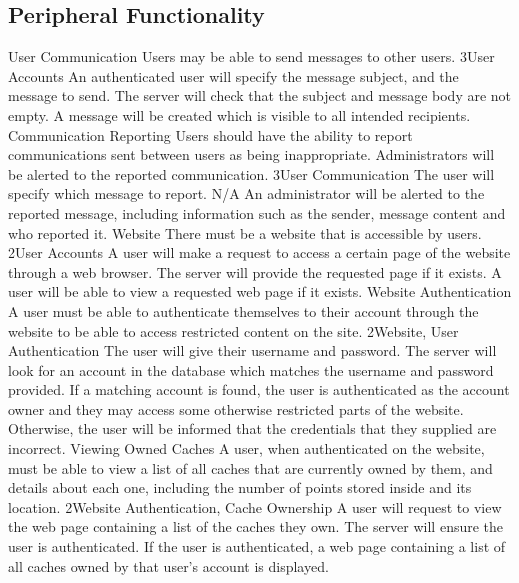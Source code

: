 	\subsection{Peripheral Functionality} %
		\funcreq %
			{User Communication}
			{Users may be able to send messages to other users.}
			{3}{User Accounts}
			{An authenticated user will specify the message subject, and the
			message to send.}
			{The server will check that the subject and message body are not
			empty.}
			{A message will be created which is visible to all intended
			recipients.}
		\funcreq %
			{Communication Reporting}
			{Users should have the ability to report communications sent
			between users as being inappropriate. Administrators will be
			alerted to the reported communication.}
			{3}{User Communication}
			{The user will specify which message to report.}
			{N/A}
			{An administrator will be alerted to the reported message,
			including information such as the sender, message content and who
			reported it.}
		\funcreq %
			{Website}
			{There must be a website that is accessible by users.}
			{2}{User Accounts}
			{A user will make a request to access a certain page of the website
			through a web browser.}
			{The server will provide the requested page if it exists.}
			{A user will be able to view a requested web page if it exists.}
		\funcreq %
			{Website Authentication}
			{A user must be able to authenticate themselves to their account
			through the website to be able to access restricted content on the
			site.}
			{2}{Website, User Authentication}
			{The user will give their username and password.}
			{The server will look for an account in the database which matches
			the username and password provided.}
			{If a matching account is found, the user is authenticated as 
			the account owner and they may access some otherwise restricted 
			parts of the website. Otherwise, the user will be informed that the
			credentials that they supplied are incorrect.}
		\funcreq %
			{Viewing Owned Caches}
			{A user, when authenticated on the website, must be able to view a
			list of all caches that are currently owned by them, and details
			about each one, including the number of points stored inside and
			its location.}
			{2}{Website Authentication, Cache Ownership}
			{A user will request to view the web page containing a list of the
			caches they own.}
			{The server will ensure the user is authenticated.}
			{If the user is authenticated, a web page containing a list of all
			caches owned by that user's account is displayed.}
		\funcreq %
